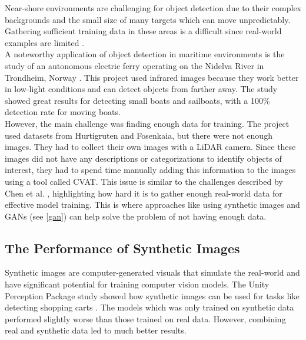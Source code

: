 \noindent Near-shore environments are challenging for object detection due to their complex backgrounds and the small size of many targets which can move unpredictably. Gathering sufficient training data in these areas is a difficult since real-world examples are limited \cite{safety}.\\

\noindent A noteworthy application of object detection in maritime environments is the study of an autonomous electric ferry operating on the Nidelva River in Trondheim, Norway \cite{NTNUFerry}. This project used infrared images because they work better in low-light conditions and can detect objects from farther away. The study showed great results for detecting small boats and sailboats, with a 100\% detection rate for moving boats. \\

\noindent However, the main challenge was finding enough data for training. The project used datasets from Hurtigruten and Fosenkaia, but there were not enough images. They had to collect their own images with a LiDAR camera. Since these images did not have any descriptions or categorizations to identify objects of interest, they had to spend time manually adding this information to the images using a tool called CVAT. This issue is similar to the challenges described by Chen et al. \cite{safety}, highlighting how hard it is to gather enough real-world data for effective model training. This is where approaches like using synthetic images and GANs (see \ref{gan}) can help solve the problem of not having enough data. \\

\subsection{The Performance of Synthetic Images}

Synthetic images are computer-generated visuals that simulate the real-world and have significant potential for training computer vision models. The Unity Perception Package study showed how synthetic images can be used for tasks like detecting shopping carts \cite{borkman2021unityperceptiongeneratesynthetic}. The models which was only trained on synthetic data performed slightly worse than those trained on real data. However, combining real and synthetic data led to much better results. \\

